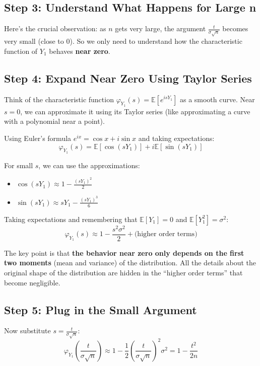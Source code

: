 \documentclass[12pt]{article}
\begin{document}
\subsection*{Step 3: Understand What Happens for Large n}

Here's the crucial observation: as $n$ gets very large, the argument $\frac{t}{\sigma\sqrt{n}}$ becomes very small (close to 0). So we only need to understand how the characteristic function of $Y_1$ behaves \textbf{near zero}.

\subsection*{Step 4: Expand Near Zero Using Taylor Series}

Think of the characteristic function $\varphi_{Y_1}(s) = \mathbb{E}[e^{isY_1}]$ as a smooth curve. Near $s = 0$, we can approximate it using its Taylor series (like approximating a curve with a polynomial near a point).

Using Euler's formula $e^{ix} = \cos x + i\sin x$ and taking expectations:
\[
\varphi_{Y_1}(s) = \mathbb{E}[\cos(sY_1)] + i\mathbb{E}[\sin(sY_1)]
\]

For small $s$, we can use the approximations:
\begin{itemize}
\item $\cos(sY_1) \approx 1 - \frac{(sY_1)^2}{2}$
    \item $\sin(sY_1) \approx sY_1 - \frac{(sY_1)^3}{6}$
\end{itemize}

Taking expectations and remembering that $\mathbb{E}[Y_1] = 0$ and $\mathbb{E}[Y_1^2] = \sigma^2$:
\[
\varphi_{Y_1}(s) \approx 1 - \frac{s^2\sigma^2}{2} + \text{(higher order terms)}
\]

The key point is that \textbf{the behavior near zero only depends on the first two moments} (mean and variance) of the distribution. All the details about the original shape of the distribution are hidden in the ``higher order terms'' that become negligible.

\subsection*{Step 5: Plug in the Small Argument}

Now substitute $s = \frac{t}{\sigma\sqrt{n}}$:
\[
\varphi_{Y_1}\left(\frac{t}{\sigma\sqrt{n}}\right) \approx 1 - \frac{1}{2}\left(\frac{t}{\sigma\sqrt{n}}\right)^2\sigma^2 = 1 - \frac{t^2}{2n}
\]
\end{document}

